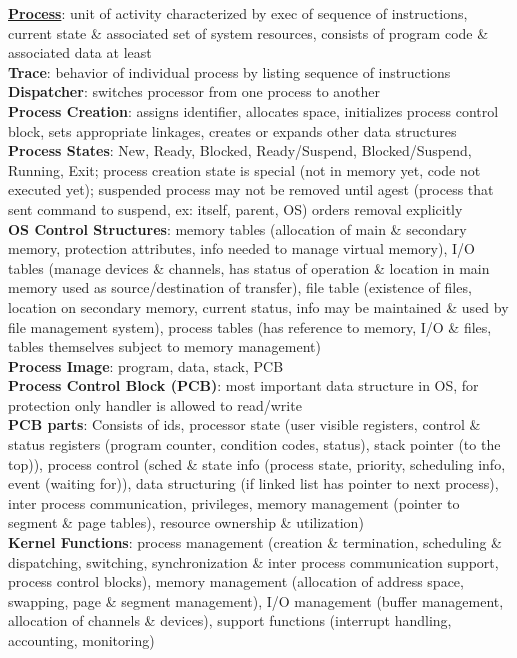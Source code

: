 \documentclass[a4paper]{article}
\begin{document}
    \begin{multicols}{2}
        \tiny
        \noindent\underline{\textbf{Process}}: unit of activity characterized by exec of sequence of instructions, current state \& associated set of system resources, consists of program code \& associated data at least\\
        \textbf{Trace}: behavior of individual process by listing sequence of instructions\\
        \textbf{Dispatcher}: switches processor from one process to another\\
        \textbf{Process Creation}: assigns identifier, allocates space, initializes process control block, sets appropriate linkages, creates or expands other data structures\\
        \textbf{Process States}: New, Ready, Blocked, Ready/Suspend, Blocked/Suspend, Running, Exit; process creation state is special (not in memory yet, code not executed yet); suspended process may not be removed until agest (process that sent command to suspend, ex: itself, parent, OS) orders removal explicitly\\
        \textbf{OS Control Structures}: memory tables (allocation of main \& secondary memory, protection attributes, info needed to manage virtual memory), I/O tables (manage devices \& channels, has status of operation \& location in main memory used as source/destination of transfer), file table (existence of files, location on secondary memory, current status, info may be maintained \& used by file management system), process tables (has reference to memory, I/O \& files, tables themselves subject to memory management)\\
        \textbf{Process Image}: program, data, stack, PCB\\
        \textbf{Process Control Block (PCB)}: most important data structure in OS, for protection only handler is allowed to read/write\\
        \textbf{PCB parts}: Consists of ids, processor state (user visible registers, control \& status registers (program counter, condition codes, status), stack pointer (to the top)), process control (sched \& state info (process state, priority, scheduling info, event (waiting for)), data structuring (if linked list has pointer to next process), inter process communication, privileges, memory management (pointer to segment \& page tables), resource ownership \& utilization)\\
        \textbf{Kernel Functions}: process management (creation \& termination, scheduling \& dispatching, switching, synchronization \& inter process communication support, process control blocks), memory management (allocation of address space, swapping, page \& segment management), I/O management  (buffer management, allocation of channels \& devices), support functions (interrupt handling, accounting, monitoring)\\

\end{multicols}
\end{document}
